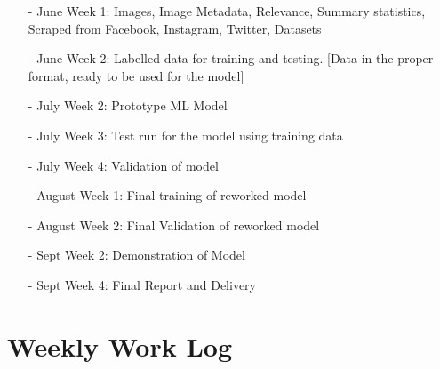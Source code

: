 \documentclass[11pt]{article}
\begin{document}
\begin{itemize}
    \item [-] June Week 1: Images, Image Metadata, Relevance, Summary statistics, Scraped from Facebook, Instagram, Twitter, Datasets
    \item [-] June Week 2: Labelled data for training and testing. [Data in the proper format, ready to be used for the model]    
    \item [-] July Week 2: Prototype ML Model
    \item [-] July Week 3: Test run for the model using training data
    \item [-] July Week 4: Validation of model
    \item [-] August Week 1: Final training of reworked model 
    \item [-] August Week 2: Final Validation of reworked model
    \item [-] Sept Week 2: Demonstration of Model
    \item [-] Sept Week 4: Final Report and Delivery
\end{itemize}
\newpage %

\section{Weekly Work Log}
\end{document}
